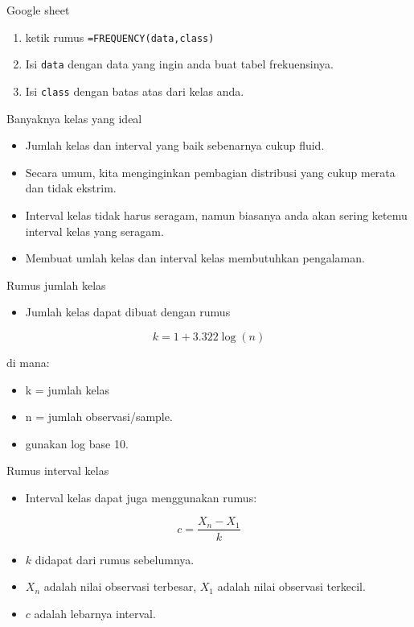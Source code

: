 \documentclass[
  ignorenonframetext,
]{beamer}
\providecommand{\tightlist}{%
  \setlength{\itemsep}{0pt}\setlength{\parskip}{0pt}}\usepackage{longtable,booktabs,array}
\begin{document}
\begin{frame}[fragile]{Google sheet}
\label{google-sheet-2}
\begin{enumerate}
\tightlist
\item
  ketik rumus \texttt{=FREQUENCY(data,class)}
\item
  Isi \texttt{data} dengan data yang ingin anda buat tabel frekuensinya.
\item
  Isi \texttt{class} dengan batas atas dari kelas anda.
\end{enumerate}
\end{frame}

\begin{frame}{Banyaknya kelas yang ideal}
\label{banyaknya-kelas-yang-ideal}
\begin{itemize}
\item
  Jumlah kelas dan interval yang baik sebenarnya cukup fluid.
\item
  Secara umum, kita menginginkan pembagian distribusi yang cukup merata
  dan tidak ekstrim.
\item
  Interval kelas tidak harus seragam, namun biasanya anda akan sering
  ketemu interval kelas yang seragam.
\item
  Membuat umlah kelas dan interval kelas membutuhkan pengalaman.
\end{itemize}
\end{frame}

\begin{frame}{Rumus jumlah kelas}
\label{rumus-jumlah-kelas}
\begin{itemize}
\tightlist
\item
  Jumlah kelas dapat dibuat dengan rumus
\end{itemize}

\[k=1+3.322\log(n)\]

di mana:

\begin{itemize}
\tightlist
\item
  k = jumlah kelas
\item
  n = jumlah observasi/sample.
\item
  gunakan log base 10.
\end{itemize}
\end{frame}

\begin{frame}{Rumus interval kelas}
\label{rumus-interval-kelas}
\begin{itemize}
\tightlist
\item
  Interval kelas dapat juga menggunakan rumus:
\end{itemize}

\[c=\frac{X_n-X_1}{k}\]

\begin{itemize}
\item
  \(k\) didapat dari rumus sebelumnya.
\item
  \(X_n\) adalah nilai observasi terbesar, \(X_1\) adalah nilai
  observasi terkecil.
\item
  \(c\) adalah lebarnya interval.
\end{itemize}
\end{frame}
\end{document}

